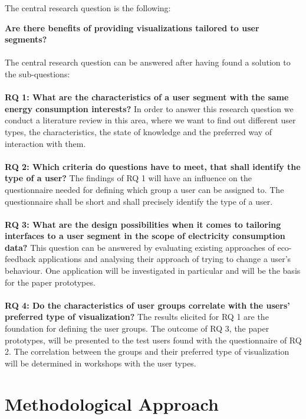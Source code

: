 The central research question is the following:

\textbf{Are there benefits of providing visualizations tailored to user segments?}
\\\\
The central research question can be answered after having found a solution to the sub-questions:\\\\
\textbf{RQ 1: What are the characteristics of a user segment with the same energy consumption interests?}
In order to answer this research question we conduct a literature review in this area, where we want to find out different user types, the characteristics, the state of knowledge and the preferred way of interaction with them.\\\\
\textbf{RQ 2: Which criteria do questions have to meet, that shall identify the type of a user?}
The findings of RQ 1 will have an influence on the questionnaire needed for defining which group a user can be assigned to. The questionnaire shall be short and shall precisely identify the type of a user.
\\\\
\textbf{RQ 3: What are the design possibilities when it comes to tailoring interfaces to a user segment in the scope of electricity consumption data?}
This question can be answered by evaluating existing approaches of eco-feedback applications and analysing their approach of trying to change a user's behaviour. One application will be investigated in particular and will be the basis for the paper prototypes.
\\\\
\textbf{RQ 4: Do the characteristics of user groups correlate with the users' preferred type of visualization?}
The results elicited for RQ 1 are the foundation for defining the user groups. The outcome of RQ 3, the paper prototypes, will be presented to the test users found with the questionnaire of RQ 2. The correlation between the groups 
and their preferred type of visualization will be determined in workshops with the user types.


\section{Methodological Approach}

